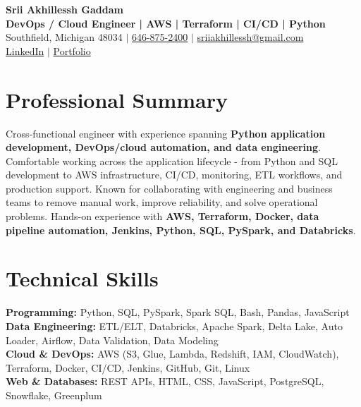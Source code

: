 \documentclass[letterpaper,10pt]{article}
\begin{document}
\fontsize{9.35pt}{10.45pt}\selectfont

\begin{center}
    {\LARGE \textbf{Srii Akhillessh Gaddam}} \\[-1pt]
    \textbf{DevOps / Cloud Engineer | AWS | Terraform | CI/CD | Python} \\[2pt]
    Southfield, Michigan 48034 $|$
    \href{tel:6468752400}{646-875-2400} $|$
    \href{mailto:sriiakhillessh@gmail.com}{sriiakhillessh@gmail.com} \\[1pt]
    \href{https://www.linkedin.com/in/srii-akhiilessh-gaddam-b48668191/}{LinkedIn} $|$
    \href{https://sriiakhillesshg.github.io/portfolio/}{Portfolio}
\end{center}
\vspace{-8pt}

\section{Professional Summary}
\small{Cross-functional engineer with experience spanning \textbf{Python application development, DevOps/cloud automation, and data engineering}. Comfortable working across the application lifecycle - from Python and SQL development to AWS infrastructure, CI/CD, monitoring, ETL workflows, and production support. Known for collaborating with engineering and business teams to remove manual work, improve reliability, and solve operational problems. Hands-on experience with \textbf{AWS, Terraform, Docker, data pipeline automation, Jenkins, Python, SQL, PySpark, and Databricks}.}

\section{Technical Skills}
\small{
\textbf{Programming:} Python, SQL, PySpark, Spark SQL, Bash, Pandas, JavaScript \\
\textbf{Data Engineering:} ETL/ELT, Databricks, Apache Spark, Delta Lake, Auto Loader, Airflow, Data Validation, Data Modeling \\
\textbf{Cloud \& DevOps:} AWS (S3, Glue, Lambda, Redshift, IAM, CloudWatch), Terraform, Docker, CI/CD, Jenkins, GitHub, Git, Linux \\
\textbf{Web \& Databases:} REST APIs, HTML, CSS, JavaScript, PostgreSQL, Snowflake, Greenplum
}
\end{document}
